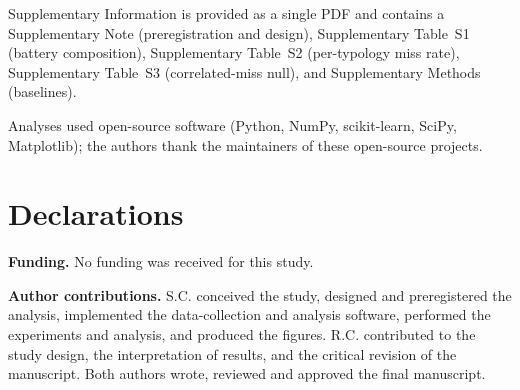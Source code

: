 \documentclass[pdflatex,sn-basic,Numbered]{sn-jnl}
\begin{document}
\clearpage
\backmatter

Supplementary Information is provided as a single PDF and contains a Supplementary Note (preregistration and design), Supplementary Table~S1 (battery composition), Supplementary Table~S2 (per-typology miss rate), Supplementary Table~S3 (correlated-miss null), and Supplementary Methods (baselines).

Analyses used open-source software (Python, NumPy, scikit-learn, SciPy, Matplotlib); the authors thank the maintainers of these open-source projects.

\section*{Declarations}

\textbf{Funding.} No funding was received for this study.

\textbf{Author contributions.} S.C. conceived the study, designed and preregistered the analysis, implemented the data-collection and analysis software, performed the experiments and analysis, and produced the figures. R.C. contributed to the study design, the interpretation of results, and the critical revision of the manuscript. Both authors wrote, reviewed and approved the final manuscript.
\end{document}
